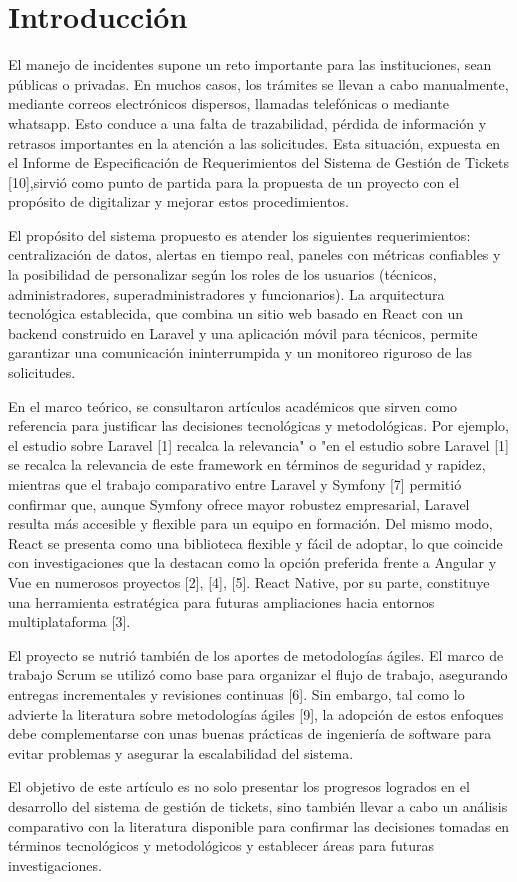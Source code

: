 \section{Introducción}
El manejo de incidentes supone un reto importante para las instituciones, sean públicas o 
privadas. En muchos casos, los trámites se llevan a cabo manualmente, mediante correos 
electrónicos dispersos, llamadas telefónicas o mediante whatsapp. Esto conduce a una 
falta de trazabilidad, pérdida de información y retrasos importantes en la atención a las 
solicitudes. Esta situación, expuesta en el Informe de Especificación de Requerimientos 
del Sistema de Gestión de Tickets [10],sirvió como punto de partida para la propuesta de 
un proyecto con el propósito de digitalizar y mejorar estos procedimientos. 

El propósito del sistema propuesto es atender los siguientes requerimientos: 
centralización de datos, alertas en tiempo real, paneles con métricas confiables y la 
posibilidad de personalizar según los roles de los usuarios (técnicos, administradores, 
superadministradores y funcionarios). La arquitectura tecnológica establecida, que 
combina un sitio web basado en React con un backend construido en Laravel y una 
aplicación móvil para técnicos, permite garantizar una comunicación ininterrumpida y un 
monitoreo riguroso de las solicitudes. 

En el marco teórico, se consultaron artículos académicos que sirven como referencia para 
justificar las decisiones tecnológicas y metodológicas. Por ejemplo, el estudio sobre 
Laravel [1] recalca la relevancia" o "en el estudio sobre Laravel [1] se recalca la 
relevancia de este framework en términos de seguridad y rapidez, mientras que el trabajo 
comparativo entre Laravel y Symfony [7] permitió confirmar que, aunque Symfony 
ofrece mayor robustez empresarial, Laravel resulta más accesible y flexible para un 
equipo en formación. Del mismo modo, React se presenta como una biblioteca flexible y 
fácil de adoptar, lo que coincide con investigaciones que la destacan como la opción 
preferida frente a Angular y Vue en numerosos proyectos [2], [4], [5]. React Native, por 
su parte, constituye una herramienta estratégica para futuras ampliaciones hacia entornos 
multiplataforma [3]. 

El proyecto se nutrió también de los aportes de metodologías ágiles. El marco de trabajo 
Scrum se utilizó como base para organizar el flujo de trabajo, asegurando entregas 
incrementales y revisiones continuas [6]. Sin embargo, tal como lo advierte la literatura 
sobre metodologías ágiles [9], la adopción de estos enfoques debe complementarse con 
unas buenas prácticas de ingeniería de software para evitar problemas y asegurar la 
escalabilidad del sistema. 

El objetivo de este artículo es no solo presentar los progresos logrados en el desarrollo 
del sistema de gestión de tickets, sino también llevar a cabo un análisis comparativo con 
la literatura disponible para confirmar las decisiones tomadas en términos tecnológicos y 
metodológicos y establecer áreas para futuras investigaciones. 